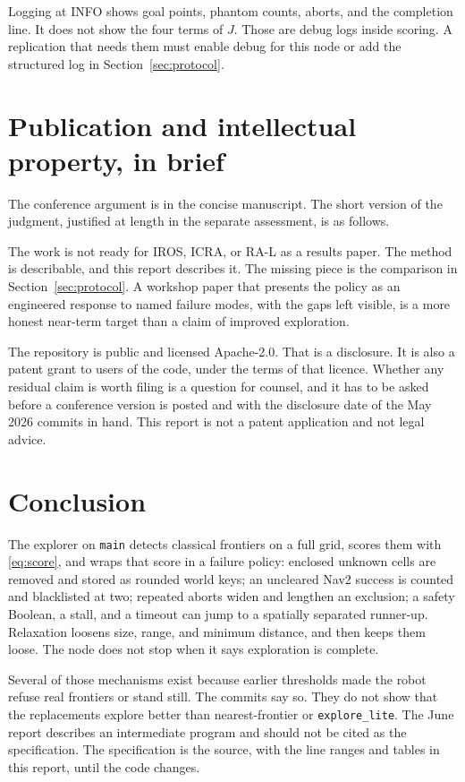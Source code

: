 \documentclass[11pt]{article}
\begin{document}
Logging at INFO shows goal points, phantom counts, aborts, and the completion line. It does not show the four terms of $J$. Those are debug logs inside scoring. A replication that needs them must enable debug for this node or add the structured log in Section~\ref{sec:protocol}.

\section{Publication and intellectual property, in brief}
The conference argument is in the concise manuscript. The short version of the judgment, justified at length in the separate assessment, is as follows.

The work is not ready for IROS, ICRA, or RA-L as a results paper. The method is describable, and this report describes it. The missing piece is the comparison in Section~\ref{sec:protocol}. A workshop paper that presents the policy as an engineered response to named failure modes, with the gaps left visible, is a more honest near-term target than a claim of improved exploration.

The repository is public and licensed Apache-2.0. That is a disclosure. It is also a patent grant to users of the code, under the terms of that licence. Whether any residual claim is worth filing is a question for counsel, and it has to be asked before a conference version is posted and with the disclosure date of the May 2026 commits in hand. This report is not a patent application and not legal advice.

\section{Conclusion}
The explorer on \texttt{main} detects classical frontiers on a full grid, scores them with \eqref{eq:score}, and wraps that score in a failure policy: enclosed unknown cells are removed and stored as rounded world keys; an uncleared Nav2 success is counted and blacklisted at two; repeated aborts widen and lengthen an exclusion; a safety Boolean, a stall, and a timeout can jump to a spatially separated runner-up. Relaxation loosens size, range, and minimum distance, and then keeps them loose. The node does not stop when it says exploration is complete.

Several of those mechanisms exist because earlier thresholds made the robot refuse real frontiers or stand still. The commits say so. They do not show that the replacements explore better than nearest-frontier or \texttt{explore\_lite}. The June report describes an intermediate program and should not be cited as the specification. The specification is the source, with the line ranges and tables in this report, until the code changes.
\end{document}
